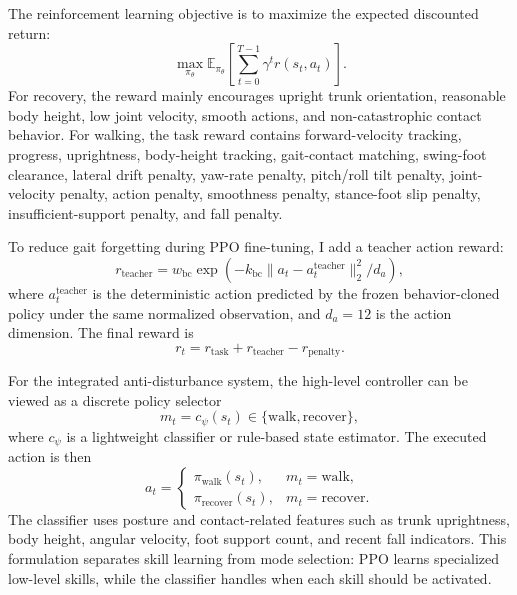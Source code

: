 \documentclass[conference]{IEEEtran}
\begin{document}
The reinforcement learning objective is to maximize the expected discounted return:
\begin{equation}
\max_{\pi_\theta} \mathbb{E}_{\pi_\theta}
\left[\sum_{t=0}^{T-1}\gamma^t r(s_t,a_t)\right].
\end{equation}
For recovery, the reward mainly encourages upright trunk orientation, reasonable body height, low joint velocity, smooth actions, and non-catastrophic contact behavior. For walking, the task reward contains forward-velocity tracking, progress, uprightness, body-height tracking, gait-contact matching, swing-foot clearance, lateral drift penalty, yaw-rate penalty, pitch/roll tilt penalty, joint-velocity penalty, action penalty, smoothness penalty, stance-foot slip penalty, insufficient-support penalty, and fall penalty.

To reduce gait forgetting during PPO fine-tuning, I add a teacher action reward:
\begin{equation}
r_{\mathrm{teacher}} =
w_{\mathrm{bc}}\exp\left(-k_{\mathrm{bc}}
\|a_t-a^{\mathrm{teacher}}_t\|_2^2/d_a\right),
\end{equation}
where $a^{\mathrm{teacher}}_t$ is the deterministic action predicted by the frozen behavior-cloned policy under the same normalized observation, and $d_a=12$ is the action dimension. The final reward is
\begin{equation}
r_t = r_{\mathrm{task}} + r_{\mathrm{teacher}} - r_{\mathrm{penalty}}.
\end{equation}

For the integrated anti-disturbance system, the high-level controller can be viewed as a discrete policy selector
\begin{equation}
m_t = c_\psi(s_t) \in \{\mathrm{walk}, \mathrm{recover}\},
\end{equation}
where $c_\psi$ is a lightweight classifier or rule-based state estimator. The executed action is then
\begin{equation}
a_t =
\begin{cases}
\pi_{\mathrm{walk}}(s_t), & m_t=\mathrm{walk},\\
\pi_{\mathrm{recover}}(s_t), & m_t=\mathrm{recover}.
\end{cases}
\end{equation}
The classifier uses posture and contact-related features such as trunk uprightness, body height, angular velocity, foot support count, and recent fall indicators. This formulation separates skill learning from mode selection: PPO learns specialized low-level skills, while the classifier handles when each skill should be activated.
\end{document}
